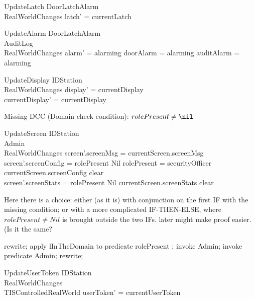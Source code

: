 \begin{schema}{UpdateLatch}
  \Xi DoorLatchAlarm\\
  RealWorldChanges
\where
  latch' = currentLatch
\end{schema}

\begin{schema}{UpdateAlarm}
  \Xi DoorLatchAlarm\\
  AuditLog\\
  RealWorldChanges
\where
  alarm' = alarming \iff  doorAlarm = alarming \lor  auditAlarm = alarming
\end{schema}

\begin{schema}{UpdateDisplay}
  \Delta IDStation\\
  RealWorldChanges
\where
  display' = currentDisplay\\
  currentDisplay' = currentDisplay
\end{schema}

Missing DCC (Domain check condition): $rolePresent \neq \nil$
\begin{schema}{UpdateScreen}
  \Delta IDStation\\
  \Xi Admin\\
  RealWorldChanges
\where
  screen'.screenMsg = currentScreen.screenMsg\\
  screen'.screenConfig = \IF rolePresent \neq  Nil \land \The rolePresent = securityOfficer \THEN  currentScreen.screenConfig \ELSE  clear\\
  screen'.screenStats = \IF  rolePresent \neq  Nil \THEN  currentScreen.screenStats \ELSE  clear
\end{schema}
Here there is a choice: either (as it is) with conjunction on the first IF with the missing condition;
or with a more complicated IF-THEN-ELSE, where $rolePresent \neq Nil$ is brought outside the two IFs.
\The later might make proof easier. (Is it the same?

\begin{zproof}
rewrite;
apply lInTheDomain to predicate rolePresent \in  \dom  \The;
invoke \Xi Admin;
invoke predicate Admin;
rewrite;
\end{zproof}

\begin{schema}{UpdateUserToken}
  \Xi IDStation\\
  RealWorldChanges\\
  \Xi TISControlledRealWorld
\where
  userToken' = currentUserToken
\end{schema}

